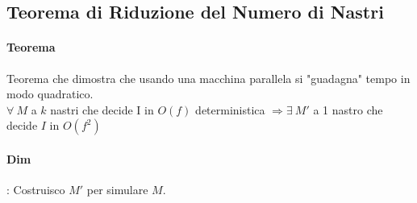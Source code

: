 \documentclass[10pt]{book}
\begin{document}
\subsection{Teorema di Riduzione del Numero di Nastri}
\paragraph{Teorema} Teorema che dimostra che usando una macchina parallela si "guadagna" tempo in modo quadratico.\\
$\forall\:M$ a $k$ nastri che decide I in $O(f)$ deterministica $\Rightarrow\exists\:M'$ a 1 nastro che decide $I$ in $O(f^2)$
\paragraph{Dim}: Costruisco $M'$ per simulare $M$.
\end{document}
